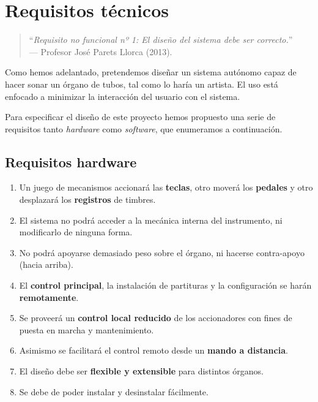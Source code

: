 \chapter{Requisitos técnicos}
\label{cap:capitulo_2}

\begin{quote}
	\small \flushright ``\textit{Requisito no funcional nº 1: El diseño del sistema debe ser correcto.}'' \\
	--- Profesor José Parets Llorca (2013).
\end{quote}

\vspace{8em}

Como hemos adelantado, pretendemos diseñar un sistema autónomo capaz de hacer sonar un órgano de tubos, tal como lo haría un artista. El uso está enfocado a minimizar la interacción del usuario con el sistema. 

Para especificar el diseño de este proyecto hemos propuesto una serie de requisitos tanto \textit{hardware} como \textit{software}, que enumeramos a continuación.

\newpage 

\section{Requisitos hardware}

\begin{enumerate}
	
	\item Un juego de mecanismos accionará las \textbf{teclas}, otro moverá los \textbf{pedales} y otro desplazará los \textbf{registros} de timbres.
	
	\item El sistema no podrá acceder a la mecánica interna del instrumento, ni modificarlo de ninguna forma.
	
	\item No podrá apoyarse demasiado peso sobre el órgano, ni hacerse contra-apoyo (hacia arriba).
	
	\item El \textbf{control principal}, la instalación de partituras y la configuración se harán \textbf{remotamente}.
	
	\item Se proveerá un \textbf{control local reducido} de los accionadores con fines de puesta en marcha y mantenimiento.
	
	\item Asimismo se facilitará el control remoto desde un \textbf{mando a distancia}.
	
	\item El diseño debe ser \textbf{flexible y extensible} para distintos órganos.
	
	\item Se debe de poder instalar y desinstalar fácilmente.
	
\end{enumerate}


